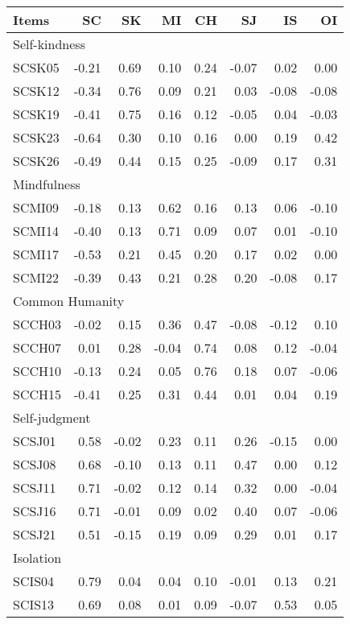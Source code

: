 \documentclass[
  man]{apa7}
\begin{document}
\begin{longtable}{lrrrrrrr}
\toprule
Items & SC & SK & MI & CH & SJ & IS & OI \\ 
\midrule
\multicolumn{8}{l}{Self-kindness} \\ 
\midrule
SCSK05 & -0.21 & 0.69 & 0.10 & 0.24 & -0.07 & 0.02 & 0.00 \\ 
SCSK12 & -0.34 & 0.76 & 0.09 & 0.21 & 0.03 & -0.08 & -0.08 \\ 
SCSK19 & -0.41 & 0.75 & 0.16 & 0.12 & -0.05 & 0.04 & -0.03 \\ 
SCSK23 & -0.64 & 0.30 & 0.10 & 0.16 & 0.00 & 0.19 & 0.42 \\ 
SCSK26 & -0.49 & 0.44 & 0.15 & 0.25 & -0.09 & 0.17 & 0.31 \\ 
\midrule
\multicolumn{8}{l}{Mindfulness} \\ 
\midrule
SCMI09 & -0.18 & 0.13 & 0.62 & 0.16 & 0.13 & 0.06 & -0.10 \\ 
SCMI14 & -0.40 & 0.13 & 0.71 & 0.09 & 0.07 & 0.01 & -0.10 \\ 
SCMI17 & -0.53 & 0.21 & 0.45 & 0.20 & 0.17 & 0.02 & 0.00 \\ 
SCMI22 & -0.39 & 0.43 & 0.21 & 0.28 & 0.20 & -0.08 & 0.17 \\ 
\midrule
\multicolumn{8}{l}{Common Humanity} \\ 
\midrule
SCCH03 & -0.02 & 0.15 & 0.36 & 0.47 & -0.08 & -0.12 & 0.10 \\ 
SCCH07 & 0.01 & 0.28 & -0.04 & 0.74 & 0.08 & 0.12 & -0.04 \\ 
SCCH10 & -0.13 & 0.24 & 0.05 & 0.76 & 0.18 & 0.07 & -0.06 \\ 
SCCH15 & -0.41 & 0.25 & 0.31 & 0.44 & 0.01 & 0.04 & 0.19 \\ 
\midrule
\multicolumn{8}{l}{Self-judgment} \\ 
\midrule
SCSJ01 & 0.58 & -0.02 & 0.23 & 0.11 & 0.26 & -0.15 & 0.00 \\ 
SCSJ08 & 0.68 & -0.10 & 0.13 & 0.11 & 0.47 & 0.00 & 0.12 \\ 
SCSJ11 & 0.71 & -0.02 & 0.12 & 0.14 & 0.32 & 0.00 & -0.04 \\ 
SCSJ16 & 0.71 & -0.01 & 0.09 & 0.02 & 0.40 & 0.07 & -0.06 \\ 
SCSJ21 & 0.51 & -0.15 & 0.19 & 0.09 & 0.29 & 0.01 & 0.17 \\ 
\midrule
\multicolumn{8}{l}{Isolation} \\ 
\midrule
SCIS04 & 0.79 & 0.04 & 0.04 & 0.10 & -0.01 & 0.13 & 0.21 \\ 
SCIS13 & 0.69 & 0.08 & 0.01 & 0.09 & -0.07 & 0.53 & 0.05 \\ 

\end{longtable}
\end{document}
